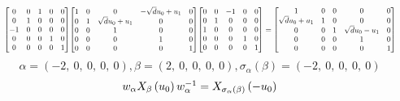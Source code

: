 \documentclass[11pt]{article}
\theoremstyle{definition}
\begin{document}
\[
\scaletoalign{\textwidth}{{\left[\begin{matrix}0 & 0 & 1 & 0 & 0\\0 & 1 & 0 & 0 & 0\\-1 & 0 & 0 & 0 & 0\\0 & 0 & 0 & 1 & 0\\0 & 0 & 0 & 0 & 1\end{matrix}\right]} {\left[\begin{matrix}1 & 0 & 0 & - \sqrt{d} u_{0} + u_{1} & 0\\0 & 1 & \sqrt{d} u_{0} + u_{1} & 0 & 0\\0 & 0 & 1 & 0 & 0\\0 & 0 & 0 & 1 & 0\\0 & 0 & 0 & 0 & 1\end{matrix}\right]} {\left[\begin{matrix}0 & 0 & -1 & 0 & 0\\0 & 1 & 0 & 0 & 0\\1 & 0 & 0 & 0 & 0\\0 & 0 & 0 & 1 & 0\\0 & 0 & 0 & 0 & 1\end{matrix}\right]} = {\left[\begin{matrix}1 & 0 & 0 & 0 & 0\\\sqrt{d} u_{0} + u_{1} & 1 & 0 & 0 & 0\\0 & 0 & 1 & \sqrt{d} u_{0} - u_{1} & 0\\0 & 0 & 0 & 1 & 0\\0 & 0 & 0 & 0 & 1\end{matrix}\right]}}
\]
\[
\alpha = \left( -2, \  0, \  0, \  0, \  0\right), \beta = \left( 2, \  0, \  0, \  0, \  0\right), \sigma_{\alpha}(\beta) = \left( -2, \  0, \  0, \  0, \  0\right)
\]
\[
\scaletoalign{\textwidth}{w_{\alpha} X_{\beta}\left(u_{0}\right) w_{\alpha}^{-1} = X_{\sigma_{\alpha}\left(\beta\right)}\left(- u_{0}\right)}
\]
\end{document}
